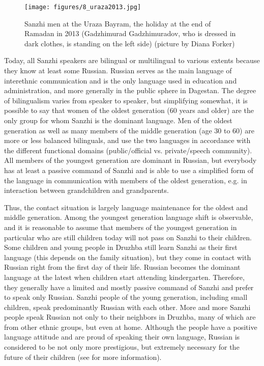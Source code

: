 \begin{figure}
	\caption{Sanzhi men at the Uraza Bayram, the holiday at the end of Ramadan in 2013 (Gadzhimurad Gadzhimuradov, who is dressed in dark clothes, is standing on the left side) (picture by Diana Forker)}
	\label{fig:SanzhiPeople}
	\texttt{[image: figures/8\_uraza2013.jpg]}
\end{figure}

Today, all Sanzhi speakers are bilingual or multilingual to various extents because they know at least some Russian. Russian serves as the main language of interethnic communication and is the only language used in education and administration, and more generally in the public sphere in Dagestan. The degree of bilingualism varies from speaker to speaker, but simplifying somewhat, it is possible to say that women of the oldest generation (60 years and older) are the only group for whom Sanzhi is the dominant language. Men of the oldest generation as well as many members of the middle generation (age 30 to 60) are more or less balanced bilinguals, and use the two languages in accordance with the different functional domains (public/official vs. private/speech community). All members of the youngest generation are dominant in Russian, but everybody has at least a passive command of Sanzhi and is able to use a simplified form of the language in communication with members of the oldest generation, e.g. in interaction between grandchildren and grandparents.

Thus, the contact situation is largely language maintenance for the oldest and middle generation. Among the youngest generation language shift is observable, and it is reasonable to assume that members of the youngest generation in particular who are still children today will not pass on Sanzhi to their children. Some children and young people in Druzhba still learn Sanzhi as their first language (this depends on the family situation), but they come in contact with Russian right from the first day of their life. Russian becomes the dominant language at the latest when children start attending kindergarten. Therefore, they generally have a limited and mostly passive command of Sanzhi and prefer to speak only Russian. Sanzhi people of the young generation, including small children, speak predominantly Russian with each other. More and more Sanzhi people speak Russian not only to their neighbors in Druzhba, many of which are from other ethnic groups, but even at home. Although the people have a positive language attitude and are proud of speaking their own language, Russian is considered to be not only more prestigious, but extremely necessary for the future of their children (see \citealt{ForkerSubmitteda} for more information).

